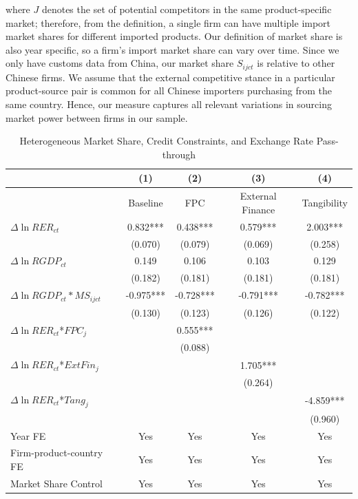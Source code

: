where $J$ denotes the set of potential competitors in the same product-specific market; therefore, from the definition, a single firm can have multiple import market shares for different imported products. Our definition of market share is also year specific, so a firm’s import market share can vary over time. Since we only have customs data from China, our market share $S_{ijct}$ is relative to other Chinese firms. We assume that the external competitive stance in a particular product-source pair is common for all Chinese importers purchasing from the same country. Hence, our measure captures all relevant variations in sourcing market power between firms in our sample.

\begin{table}[htb]
	\centering
	\caption{Heterogeneous Market Share, Credit Constraints, and Exchange Rate Pass-through}
	\begin{threeparttable}
		\begin{tabular}{lcccc}
			\toprule
			& (1)   & (2)   & (3)   & (4) \\
			\midrule
			&  Baseline     & FPC & External Finance& Tangibility        \\
			\midrule
			$\Delta \ln RER_{ct}$ & 0.832*** & 0.438*** & 0.579*** & 2.003*** \\
			& (0.070) & (0.079) & (0.069) & (0.258) \\
			$\Delta \ln RGDP_{ct}$ & 0.149 & 0.106 & 0.103 & 0.129 \\
			& (0.182) & (0.181) & (0.181) & (0.181) \\
			$\Delta \ln RGDP_{ct}*MS_{ijct}$ & -0.975*** & -0.728*** & -0.791*** & -0.782*** \\
			& (0.130) & (0.123) & (0.126) & (0.122) \\
			$\Delta \ln RER_{ct}$*$FPC_{j}$ &  & 0.555*** &       &  \\
			&  & (0.088) &       &  \\
			$\Delta \ln RER_{ct}$*$ExtFin_{j}$ &   &       & 1.705*** &  \\
			&  &       & (0.264) &  \\
			$\Delta \ln RER_{ct}$*$Tang_{j}$ &   &       &       & -4.859*** \\
			&   &       &       & (0.960) \\
			Year FE  & Yes  & Yes   & Yes   & Yes \\
			Firm-product-country FE & Yes    & Yes   & Yes   & Yes \\
			Market Share Control & Yes   & Yes   & Yes   & Yes \\

\end{tabular}
\end{threeparttable}
\end{table}
